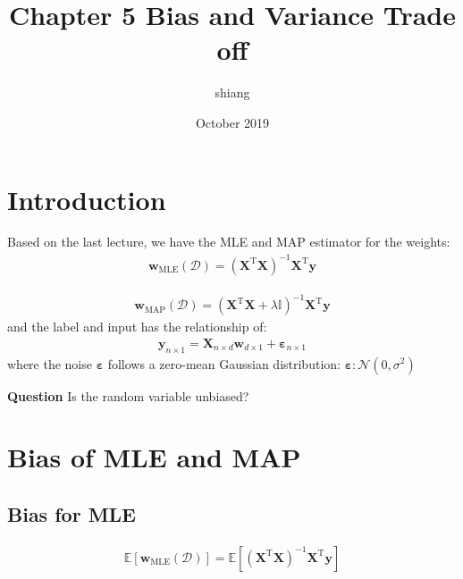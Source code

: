 \documentclass{article}
\title{Chapter 5 Bias and Variance Trade off}
\author{shiang }
\date{October 2019}
\begin{document}
\maketitle

\section{Introduction}
Based on the last lecture, we have the MLE and MAP estimator for the weights:
\begin{equation}\label{MLE}
    \begin{aligned}
        \mathbf{w}_{\text{MLE}}(\mathcal{D}) = (\mathbf{X}^{\mathrm{T}} \mathbf{X})^{-1} \mathbf{X}^{\mathrm{T}} \mathbf{y}
    \end{aligned}
\end{equation}

\begin{equation}\label{MAP}
    \begin{aligned}
        \mathbf{w}_{\text{MAP}}(\mathcal{D}) = (\mathbf{X}^{\mathrm{T}} \mathbf{X} + \lambda \mathbb{I})^{-1} \mathbf{X}^{\mathrm{T}} \mathbf{y}
    \end{aligned}
\end{equation}
and the label and input has the relationship of:
\begin{equation}
    \begin{aligned}
        \mathbf{y}_{n\times 1} = \mathbf{X}_{n\times d} \mathbf{w}_{d\times 1} + \boldsymbol{\varepsilon}_{n\times 1}
    \end{aligned}
\end{equation}
where the noise $\boldsymbol{\varepsilon}$ follows a zero-mean Gaussian distribution: $\boldsymbol{\varepsilon}: \mathcal{N}(0, \sigma^2)$

\textbf{Question}
Is the random variable unbiased?

\section{Bias of MLE and MAP}
\subsection{Bias for MLE}
\begin{equation}
    \begin{aligned}
        \mathbb{E}[\mathbf{w}_{\text{MLE}}(\mathcal{D})] = \mathbb{E}[(\mathbf{X}^{\mathrm{T}} \mathbf{X})^{-1} \mathbf{X}^{\mathrm{T}} \mathbf{y}]
    \end{aligned}
\end{equation}
\end{document}

